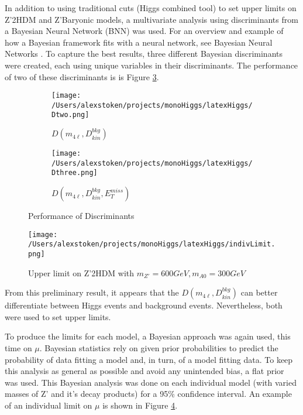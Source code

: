 \documentclass[11pt, english]{article}
\begin{document}
In addition to using traditional cuts (Higgs combined tool) to set upper limits on Z'2HDM and Z'Baryonic models, a multivariate analysis using discriminants from a Bayesian Neural Network (BNN) was used. For an overview and example of how a Bayesian framework fits with a neural network, see Bayesian Neural Networks \cite{BNN:1}. To capture the best results, three different Bayesian discriminants were created, each using unique variables in their discriminants. The performance of two of these discriminants is is Figure \ref{fig: Dperform}.

\begin{figure}[h!]
	\begin{subfigure}{.5\textwidth}
		\centering
		\texttt{[image: /Users/alexstoken/projects/monoHiggs/latexHiggs/Dtwo.png]}
		\caption{$D(m_{4\ell}, D_{kin}^{bkg})$}
		\label{fig: D2}
	\end{subfigure}%
	\begin{subfigure}{.5\textwidth}
		\centering
		\texttt{[image: /Users/alexstoken/projects/monoHiggs/latexHiggs/Dthree.png]}
		\caption{$D(m_{4\ell}, D_{kin}^{bkg}, E_{T}^{miss})$}
		\label{fig: D3}
	\end{subfigure}
	
	\caption{Performance of Discriminants}
	\label{fig: Dperform}	
\end{figure}

\begin{figure}[b!]
	\texttt{[image: /Users/alexstoken/projects/monoHiggs/latexHiggs/indivLimit.png]}
	\caption{Upper limit on Z'2HDM with $m_{Z'} = 600 GeV, m_{A0} = 300 GeV $}
	\label{fig: indvlimit1}
\end{figure}


From this preliminary result, it appears that the $D(m_{4\ell}, D_{kin}^{bkg})$ can better differentiate between Higgs events and background events. Nevertheless, both were used to set upper limits.

To produce the limits for each model, a Bayesian approach was again used, this time on $\mu$. Bayesian statistics rely on given prior probabilities to predict the probability of data fitting a model and, in turn, of a model fitting data. To keep this analysis as general as possible and avoid any unintended bias, a flat prior was used. This Bayesian analysis was done on each individual model (with varied masses of Z' and it's decay products) for a 95\% confidence interval. An example of an individual limit on $\mu$ is shown in Figure \ref{fig: indvlimit1}.
\end{document}
